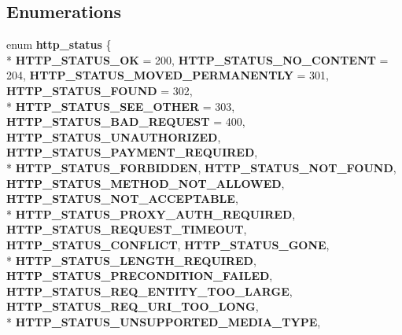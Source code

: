 \subsection*{Enumerations}
\begin{DoxyCompactItemize}
\item 
enum {\bfseries http\+\_\+status} \{ \\*
{\bfseries H\+T\+T\+P\+\_\+\+S\+T\+A\+T\+U\+S\+\_\+\+OK} = 200, 
{\bfseries H\+T\+T\+P\+\_\+\+S\+T\+A\+T\+U\+S\+\_\+\+N\+O\+\_\+\+C\+O\+N\+T\+E\+NT} = 204, 
{\bfseries H\+T\+T\+P\+\_\+\+S\+T\+A\+T\+U\+S\+\_\+\+M\+O\+V\+E\+D\+\_\+\+P\+E\+R\+M\+A\+N\+E\+N\+T\+LY} = 301, 
{\bfseries H\+T\+T\+P\+\_\+\+S\+T\+A\+T\+U\+S\+\_\+\+F\+O\+U\+ND} = 302, 
\\*
{\bfseries H\+T\+T\+P\+\_\+\+S\+T\+A\+T\+U\+S\+\_\+\+S\+E\+E\+\_\+\+O\+T\+H\+ER} = 303, 
{\bfseries H\+T\+T\+P\+\_\+\+S\+T\+A\+T\+U\+S\+\_\+\+B\+A\+D\+\_\+\+R\+E\+Q\+U\+E\+ST} = 400, 
{\bfseries H\+T\+T\+P\+\_\+\+S\+T\+A\+T\+U\+S\+\_\+\+U\+N\+A\+U\+T\+H\+O\+R\+I\+Z\+ED}, 
{\bfseries H\+T\+T\+P\+\_\+\+S\+T\+A\+T\+U\+S\+\_\+\+P\+A\+Y\+M\+E\+N\+T\+\_\+\+R\+E\+Q\+U\+I\+R\+ED}, 
\\*
{\bfseries H\+T\+T\+P\+\_\+\+S\+T\+A\+T\+U\+S\+\_\+\+F\+O\+R\+B\+I\+D\+D\+EN}, 
{\bfseries H\+T\+T\+P\+\_\+\+S\+T\+A\+T\+U\+S\+\_\+\+N\+O\+T\+\_\+\+F\+O\+U\+ND}, 
{\bfseries H\+T\+T\+P\+\_\+\+S\+T\+A\+T\+U\+S\+\_\+\+M\+E\+T\+H\+O\+D\+\_\+\+N\+O\+T\+\_\+\+A\+L\+L\+O\+W\+ED}, 
{\bfseries H\+T\+T\+P\+\_\+\+S\+T\+A\+T\+U\+S\+\_\+\+N\+O\+T\+\_\+\+A\+C\+C\+E\+P\+T\+A\+B\+LE}, 
\\*
{\bfseries H\+T\+T\+P\+\_\+\+S\+T\+A\+T\+U\+S\+\_\+\+P\+R\+O\+X\+Y\+\_\+\+A\+U\+T\+H\+\_\+\+R\+E\+Q\+U\+I\+R\+ED}, 
{\bfseries H\+T\+T\+P\+\_\+\+S\+T\+A\+T\+U\+S\+\_\+\+R\+E\+Q\+U\+E\+S\+T\+\_\+\+T\+I\+M\+E\+O\+UT}, 
{\bfseries H\+T\+T\+P\+\_\+\+S\+T\+A\+T\+U\+S\+\_\+\+C\+O\+N\+F\+L\+I\+CT}, 
{\bfseries H\+T\+T\+P\+\_\+\+S\+T\+A\+T\+U\+S\+\_\+\+G\+O\+NE}, 
\\*
{\bfseries H\+T\+T\+P\+\_\+\+S\+T\+A\+T\+U\+S\+\_\+\+L\+E\+N\+G\+T\+H\+\_\+\+R\+E\+Q\+U\+I\+R\+ED}, 
{\bfseries H\+T\+T\+P\+\_\+\+S\+T\+A\+T\+U\+S\+\_\+\+P\+R\+E\+C\+O\+N\+D\+I\+T\+I\+O\+N\+\_\+\+F\+A\+I\+L\+ED}, 
{\bfseries H\+T\+T\+P\+\_\+\+S\+T\+A\+T\+U\+S\+\_\+\+R\+E\+Q\+\_\+\+E\+N\+T\+I\+T\+Y\+\_\+\+T\+O\+O\+\_\+\+L\+A\+R\+GE}, 
{\bfseries H\+T\+T\+P\+\_\+\+S\+T\+A\+T\+U\+S\+\_\+\+R\+E\+Q\+\_\+\+U\+R\+I\+\_\+\+T\+O\+O\+\_\+\+L\+O\+NG}, 
\\*
{\bfseries H\+T\+T\+P\+\_\+\+S\+T\+A\+T\+U\+S\+\_\+\+U\+N\+S\+U\+P\+P\+O\+R\+T\+E\+D\+\_\+\+M\+E\+D\+I\+A\+\_\+\+T\+Y\+PE}, 

\end{DoxyCompactItemize}
